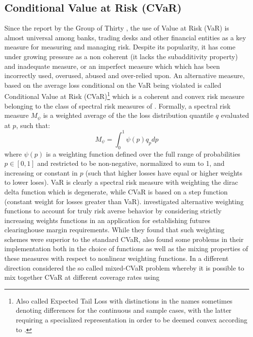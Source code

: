 \subsection{Conditional Value at Risk (CVaR)}\label{cvar}
Since the report by the Group of Thirty , the use of
Value  at Risk (VaR) is almost universal among banks, trading desks and other
financial entities as a key measure for measuring and managing risk. Despite
its popularity, it has come under growing pressure as a non coherent (it
lacks the subadditivity property) and inadequate measure, or an imperfect
measure which which has been incorrectly used, overused, abused and
over-relied upon. An alternative measure, based on the average loss
conditional on the VaR being violated is called Conditional Value at Risk
(CVaR)\footnote{Also called Expected Tail Loss with distinctions in the names
sometimes denoting differences for the continuous and sample cases, with the
latter requiring a specialized representation in order to be deemed convex
according to .} which is a coherent and convex
risk measure belonging to the class of spectral risk measures of
. Formally, a spectral risk measure $M_\psi$ is a
weighted average of the the loss distribution quantile $q$ evaluated at $p$,
such that:
\begin{equation}
{M_\psi }=\int_0^1 {\psi \left( p \right){q_p}dp}
\end{equation}
where $\psi\left(p\right)$ is a weighting function defined over the full
range of  probabilities $p \in \left[ {0,1} \right]$ and restricted to be
non-negative, normalized to sum to 1, and increasing or constant in $p$ (such
that higher losses have equal or higher weights to lower loses). VaR is
clearly a spectral risk measure with weighting the dirac delta function which
is degenerate, while CVaR is based on a step function (constant weight for
losses greater than VaR).  investigated alternative
weighting functions to account for truly risk averse behavior by considering
strictly increasing weights functions in an application for establishing
futures clearinghouse margin requirements. While they found that such
weighting schemes were superior to the standard CVaR, 
also found some problems in their implementation both in the choice of
functions as well as the mixing properties of these measures with respect to
nonlinear weighting functions. In a different direction
 considered the so called mixed-CVaR problem
whereby it is possible to mix together CVaR at different coverage rates using
